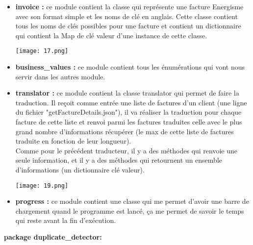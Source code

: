 \begin{itemize}
\begin{itemize}
	\end{itemize}
	\item \textbf{invoice :} ce module contient la classe qui représente une facture Energisme avec son format simple et les noms de clé en anglais. Cette classe contient tous les noms de clés possibles pour une facture et contient un dictionnaire qui contient la Map de clé valeur d'une instance de cette classe.
	\begin{center}
		\texttt{[image: 17.png]}
	\end{center} 
	\item \textbf{business{\_}values :} ce module contient tous les énumérations qui vont nous servir dans les autres module.
	\item \textbf{translator :} ce module contient la classe translator qui permet de faire la traduction. Il reçoit comme entrée une liste de factures d'un client (une ligne du fichier "getFactureDetails.json"), il va réaliser la traduction pour chaque facture de cette liste et renvoi parmi les factures traduites celle avec le plus grand nombre d'informations récupérer (le max de cette liste de factures traduite en fonction de leur longueur).\\
	Comme pour le précédent traducteur, il y a des méthodes qui renvoie une seule information, et il y a des méthodes qui retournent un ensemble d'informations (un dictionnaire clé valeur).
	\begin{center}
		\texttt{[image: 19.png]}
	\end{center} 
	\item \textbf{progress :} ce module contient une classe qui me permet d'avoir une barre de chargement quand le programme est lancé, ça me permet de savoir le temps qui reste avant la fin d’exécution.
\end{itemize}
\textbf{package duplicate{\_}detector:}


